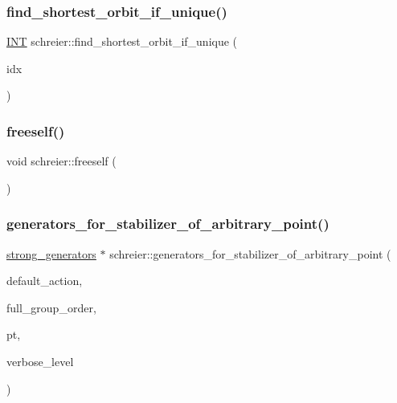 \subsubsection{\texorpdfstring{find\+\_\+shortest\+\_\+orbit\+\_\+if\+\_\+unique()}{find\_shortest\_orbit\_if\_unique()}}
{\footnotesize\ttfamily \mbox{\hyperlink{galois_8h_a09fddde158a3a20bd2dcadb609de11dc}{I\+NT}} schreier\+::find\+\_\+shortest\+\_\+orbit\+\_\+if\+\_\+unique (\begin{DoxyParamCaption}\item[{\mbox{\hyperlink{galois_8h_a09fddde158a3a20bd2dcadb609de11dc}{I\+NT}} \&}]{idx }\end{DoxyParamCaption})}

\mbox{\label{classschreier_aa3e8a3de78a5bb08b1035e5a793b4129}} 
\subsubsection{\texorpdfstring{freeself()}{freeself()}}
{\footnotesize\ttfamily void schreier\+::freeself (\begin{DoxyParamCaption}{ }\end{DoxyParamCaption})}

\mbox{\label{classschreier_aa6cc932d095c7acfbc2f764828fde3f8}} 
\subsubsection{\texorpdfstring{generators\+\_\+for\+\_\+stabilizer\+\_\+of\+\_\+arbitrary\+\_\+point()}{generators\_for\_stabilizer\_of\_arbitrary\_point()}}
{\footnotesize\ttfamily \mbox{\hyperlink{classstrong__generators}{strong\+\_\+generators}} $\ast$ schreier\+::generators\+\_\+for\+\_\+stabilizer\+\_\+of\+\_\+arbitrary\+\_\+point (\begin{DoxyParamCaption}\item[{\mbox{\hyperlink{classaction}{action}} $\ast$}]{default\+\_\+action,  }\item[{\mbox{\hyperlink{classlonginteger__object}{longinteger\+\_\+object}} \&}]{full\+\_\+group\+\_\+order,  }\item[{\mbox{\hyperlink{galois_8h_a09fddde158a3a20bd2dcadb609de11dc}{I\+NT}}}]{pt,  }\item[{\mbox{\hyperlink{galois_8h_a09fddde158a3a20bd2dcadb609de11dc}{I\+NT}}}]{verbose\+\_\+level }\end{DoxyParamCaption})}

